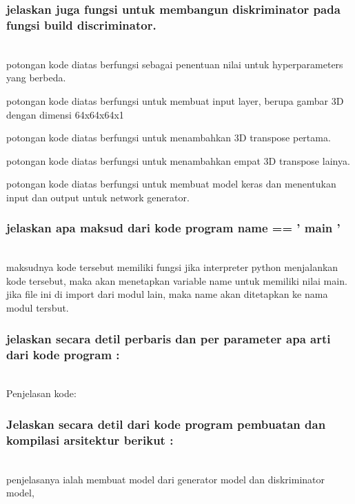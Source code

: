 \subsubsection{jelaskan juga fungsi untuk membangun diskriminator pada fungsi build discriminator.}
\hfill\\

potongan kode diatas berfungsi sebagai penentuan nilai untuk hyperparameters yang berbeda.

potongan kode diatas berfungsi untuk membuat input layer, berupa gambar 3D dengan dimensi 64x64x64x1

potongan kode diatas berfungsi untuk menambahkan 3D transpose pertama.

potongan kode diatas berfungsi untuk menambahkan empat 3D transpose lainya.

potongan kode diatas berfungsi untuk membuat model keras dan menentukan input dan output untuk network generator.

\subsubsection{jelaskan apa maksud dari kode program name == ' main '}
\hfill\\

maksudnya kode tersebut memiliki fungsi jika interpreter python menjalankan kode tersebut,  maka akan menetapkan variable name untuk memiliki nilai main. jika file ini di import dari modul lain, maka name akan ditetapkan ke nama modul tersbut.

\subsubsection{jelaskan secara detil perbaris dan per parameter apa arti dari kode program :}
\hfill\\
Penjelasan kode:



\subsubsection{Jelaskan secara detil dari kode program pembuatan dan kompilasi arsitektur berikut :}
\hfill\\

penjelasanya ialah membuat model dari generator model dan diskriminator model,


